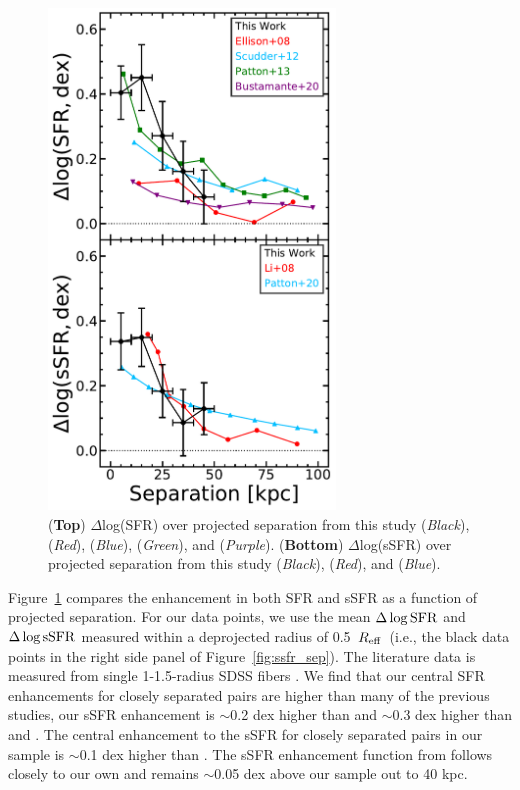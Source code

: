 \documentclass[iop,revtex4,twocolumn,apj,numberedappendix,appendixfloats]{emulateapj}
\newcommand{\reff}{$R_{\rm eff}$}
\begin{document}
\begin{figure}
\centering
\includegraphics[width=3in]{fig/nuc_sep.pdf}
\caption[]{(\textbf{Top}) $\Delta$log(SFR) over projected separation from this study ({\it Black}), \citet{Ellison:2008} ({\it Red}), \citet{Scudder:2012} ({\it Blue}), \citet{Patton:2013} ({\it Green}), and \citet{Bustamante:2020} ({\it Purple}). (\textbf{Bottom}) $\Delta$log(sSFR) over projected separation from this study ({\it Black}), \citet{Li:2008} ({\it Red}), and \citet{Patton:2020} ({\it Blue}).}
\label{fig:nuc_sep}
\end{figure}

Figure~\ref{fig:nuc_sep} compares the enhancement in both SFR and sSFR as a function of projected separation. For our data points, we use the mean $\Delta\log{\rm SFR}$ and $\Delta\log{\rm sSFR}$ measured within a deprojected radius of 0.5~\reff\ (i.e., the black data points in the right side panel of Figure~\ref{fig:ssfr_sep}). The literature data is measured from single 1-1.5\arcsec-radius SDSS fibers \citep{Ellison:2008,Scudder:2012,Patton:2013,Bustamante:2020}. We find that our central SFR enhancements for closely separated pairs are higher than many of the previous studies, our sSFR enhancement is $\sim$0.2 dex higher than \citet{Scudder:2012} and $\sim$0.3 dex higher than \citet{Ellison:2008} and \citet{Bustamante:2020}. The central enhancement to the sSFR for closely separated pairs in our sample is $\sim$0.1 dex higher than \citet{Patton:2013}. The sSFR enhancement function from \citet{Li:2008} follows closely to our own and remains $\sim$0.05 dex above our sample out to 40 kpc.  
\end{document}
